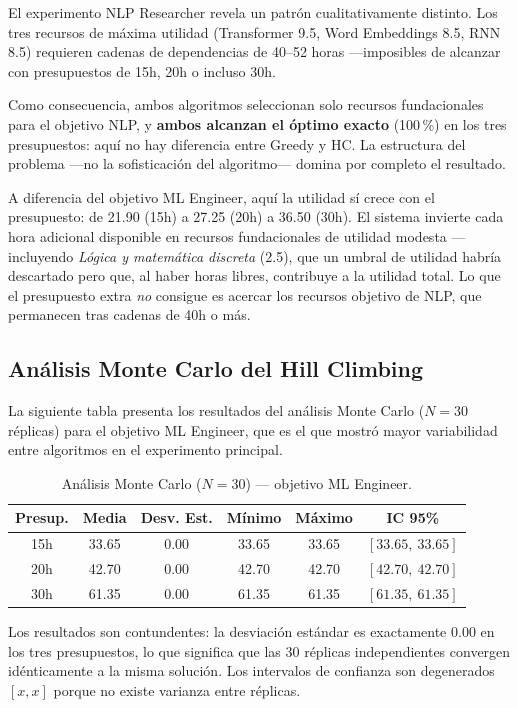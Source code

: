 \documentclass[11pt, a4paper]{article}
\begin{document}
El experimento NLP Researcher revela un patrón cualitativamente distinto. Los tres recursos de máxima utilidad (Transformer 9.5, Word Embeddings 8.5, RNN 8.5) requieren cadenas de dependencias de 40–52 horas —imposibles de alcanzar con presupuestos de 15h, 20h o incluso 30h.

Como consecuencia, ambos algoritmos seleccionan solo recursos fundacionales para el objetivo NLP, y \textbf{ambos alcanzan el óptimo exacto} (100\,\%) en los tres presupuestos: aquí no hay diferencia entre Greedy y HC. La estructura del problema —no la sofisticación del algoritmo— domina por completo el resultado.

A diferencia del objetivo ML Engineer, aquí la utilidad sí crece con el presupuesto: de 21.90 (15h) a 27.25 (20h) a 36.50 (30h). El sistema invierte cada hora adicional disponible en recursos fundacionales de utilidad modesta —incluyendo \emph{Lógica y matemática discreta} (2.5), que un umbral de utilidad habría descartado pero que, al haber horas libres, contribuye a la utilidad total. Lo que el presupuesto extra \emph{no} consigue es acercar los recursos objetivo de NLP, que permanecen tras cadenas de 40h o más.

\subsection{Análisis Monte Carlo del Hill Climbing}

La siguiente tabla presenta los resultados del análisis Monte Carlo ($N = 30$ réplicas) para el objetivo ML Engineer, que es el que mostró mayor variabilidad entre algoritmos en el experimento principal.

\begin{table}[H]
\centering
\small
\caption{Análisis Monte Carlo ($N=30$) — objetivo ML Engineer.}
\begin{tabular}{c ccccc}
\toprule
\textbf{Presup.} & \textbf{Media} & \textbf{Desv. Est.} & \textbf{Mínimo} & \textbf{Máximo} & \textbf{IC 95\%} \\
\midrule
15h & 33.65 & 0.00 & 33.65 & 33.65 & $[33.65,\ 33.65]$ \\
20h & 42.70 & 0.00 & 42.70 & 42.70 & $[42.70,\ 42.70]$ \\
30h & 61.35 & 0.00 & 61.35 & 61.35 & $[61.35,\ 61.35]$ \\
\bottomrule
\end{tabular}
\end{table}

Los resultados son contundentes: la desviación estándar es exactamente 0.00 en los tres presupuestos, lo que significa que las 30 réplicas independientes convergen idénticamente a la misma solución. Los intervalos de confianza son degenerados $[x, x]$ porque no existe varianza entre réplicas.
\end{document}
